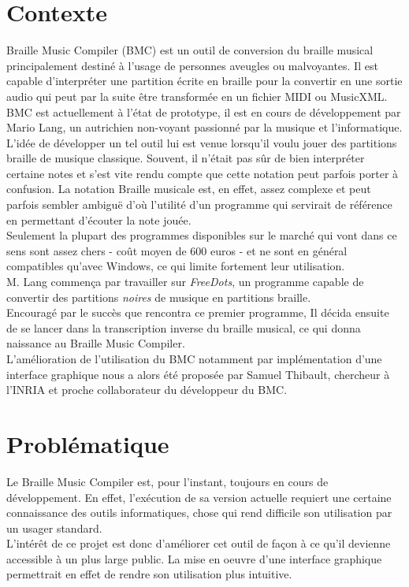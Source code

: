\section*{Contexte}
Braille Music Compiler (BMC) est un outil de conversion du braille musical principalement destiné à l'usage de personnes aveugles ou malvoyantes. Il est capable d'interpréter une partition écrite en braille pour la convertir en une sortie audio qui peut par la suite être transformée en un fichier  MIDI ou MusicXML.\\

  BMC est actuellement à l'état de prototype, il est en cours de développement par Mario Lang, un autrichien non-voyant passionné par la musique et l'informatique.\\

  L'idée de développer un tel outil lui est venue lorsqu'il voulu jouer des partitions braille de musique classique. Souvent, il n'était pas sûr de bien interpréter certaine notes et s'est vite rendu compte que cette notation peut parfois porter à confusion. La notation Braille musicale est, en effet, assez complexe et peut parfois sembler ambiguë d'où l'utilité d'un programme qui servirait de référence en permettant d'écouter la note jouée. \\
  
  Seulement la plupart des programmes disponibles sur le marché qui vont dans ce sens sont assez chers - coût moyen de 600 euros - et ne sont en général compatibles qu'avec Windows, ce qui limite fortement leur utilisation.\\
 
  M. Lang commença par travailler sur \textit{FreeDots}, un programme capable de convertir des partitions \textit{noires} de musique en partitions braille.\\
  Encouragé par le succès que rencontra ce premier programme, Il décida ensuite de se lancer dans la transcription inverse du braille musical, ce qui donna naissance au Braille Music Compiler. \\
  
  L'amélioration de l'utilisation du BMC notamment par implémentation d'une interface graphique nous a alors été proposée par Samuel Thibault, chercheur à l'INRIA et proche collaborateur du développeur du BMC. 
  
  
 
\section*{Problématique}
Le Braille Music Compiler est, pour l'instant, toujours en cours de développement. En effet, l'exécution de sa version actuelle requiert une certaine connaissance des outils informatiques, chose qui rend difficile son utilisation par un usager standard.\\
L'intérêt de ce projet est donc d'améliorer cet outil de façon à ce qu'il devienne accessible à un plus large public. La mise en oeuvre d'une interface graphique permettrait en effet de rendre son utilisation plus intuitive.\\

